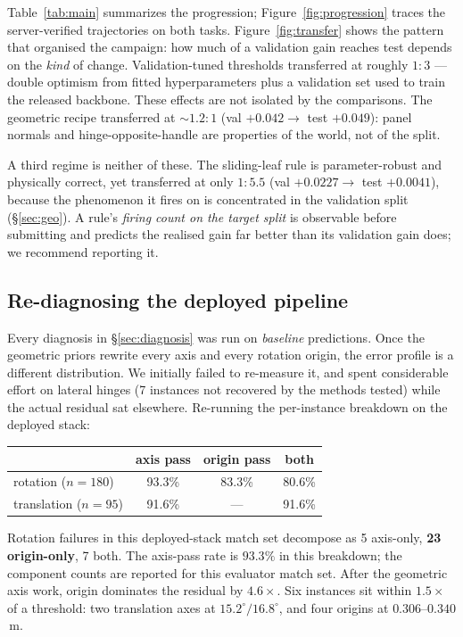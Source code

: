 \documentclass[11pt]{article}
\begin{document}
Table~\ref{tab:main} summarizes the progression;
Figure~\ref{fig:progression} traces the server-verified trajectories on
both tasks. Figure~\ref{fig:transfer} shows the pattern that organised the
campaign: how much of a validation gain reaches test depends on the
\emph{kind} of change. Validation-tuned thresholds transferred at roughly
$1{:}3$ --- double optimism from fitted hyperparameters plus a validation
set used to train the released backbone. These effects are not isolated by
the comparisons. The geometric recipe transferred
at $\sim$$1.2{:}1$ (val $+0.042 \rightarrow$ test $+0.049$): panel normals
and hinge-opposite-handle are properties of the world, not of the split.

A third regime is neither of these. The sliding-leaf rule is
parameter-robust and physically correct, yet transferred at only $1{:}5.5$
(val $+0.0227 \rightarrow$ test $+0.0041$), because the phenomenon it fires
on is concentrated in the validation split (\S\ref{sec:geo}). A rule's
\emph{firing count on the target split} is observable before submitting and
predicts the realised gain far better than its validation gain does; we
recommend reporting it.

\subsection{Re-diagnosing the deployed pipeline}
\label{sec:sweep}

Every diagnosis in \S\ref{sec:diagnosis} was run on \emph{baseline}
predictions. Once the geometric priors rewrite every axis and every
rotation origin, the error profile is a different distribution. We
initially failed to re-measure it, and spent considerable effort on lateral
hinges (7 instances not recovered by the methods tested) while the actual residual sat
elsewhere. Re-running the per-instance breakdown on the deployed stack:

\begin{center}
\small
\begin{tabular}{lccc}
\toprule
& axis pass & origin pass & both \\
\midrule
rotation ($n{=}180$) & 93.3\% & 83.3\% & 80.6\% \\
translation ($n{=}95$) & 91.6\% & --- & 91.6\% \\
\bottomrule
\end{tabular}
\end{center}

Rotation failures in this deployed-stack match set decompose as 5 axis-only,
\textbf{23 origin-only}, 7 both. The axis-pass rate is $93.3\%$ in this
breakdown; the component counts are reported for this evaluator match set.
After the geometric axis work, origin dominates the residual by $4.6\times$.
Six instances sit within $1.5\times$ of a threshold: two translation axes at
$15.2^\circ/16.8^\circ$, and four origins at $0.306$--$0.340$\,m.
\end{document}
